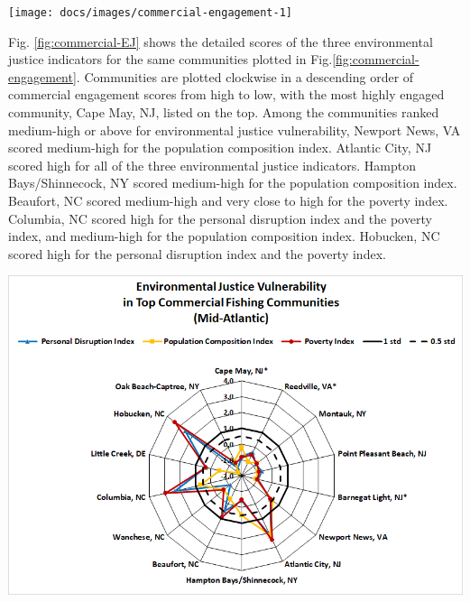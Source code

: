 \documentclass[
  10pt,
]{article}
\let\origfigure\figure
\let\endorigfigure\endfigure
\renewenvironment{figure}[1][2] {
    \expandafter\origfigure\expandafter[H]
} {
    \endorigfigure
}
\begin{document}
\begin{figure}

{\centering \texttt{[image: docs/images/commercial-engagement-1]} 

}

\caption{Commercial engagement, reliance, and environmental justice vulnerability for the top commercially engaged and reliant fishing communities in the Mid-Atlantic.  Communities ranked medium-high or above for one or more of the environmental justice indicators are highlighted in bright orange. *Community scored high (1.00 and above) for both commercial engagement and reliance indicators.}\label{fig:commercial-engagement}
\end{figure}

Fig. \ref{fig:commercial-EJ} shows the detailed scores of the three
environmental justice indicators for the same communities plotted in
Fig.\ref{fig:commercial-engagement}. Communities are plotted clockwise
in a descending order of commercial engagement scores from high to low,
with the most highly engaged community, Cape May, NJ, listed on the top.
Among the communities ranked medium-high or above for environmental
justice vulnerability, Newport News, VA scored medium-high for the
population composition index. Atlantic City, NJ scored high for all of
the three environmental justice indicators. Hampton Bays/Shinnecock, NY
scored medium-high for the population composition index. Beaufort, NC
scored medium-high and very close to high for the poverty index.
Columbia, NC scored high for the personal disruption index and the
poverty index, and medium-high for the population composition index.
Hobucken, NC scored high for the personal disruption index and the
poverty index.

\begin{figure}

{\centering \includegraphics[width=0.7\linewidth]{images/EJ_Commercial_MAB} 

}

\caption{Environmental justice indicators (Poverty Index, population composition index, and personal disruption index) for top commercial fishing communities in Mid-Atlantic. *Community scored high (1.00 and above) for both commercial engagement and reliance indicators.}\label{fig:commercial-EJ}
\end{figure}
\end{document}
